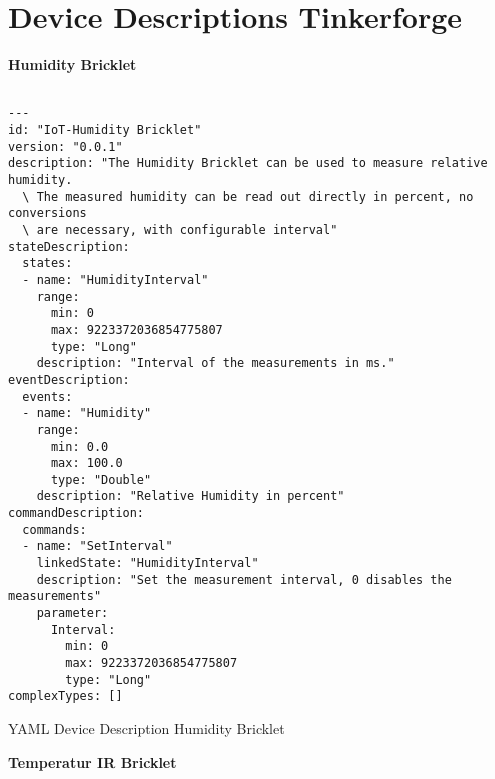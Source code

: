 \chapter{Device Descriptions Tinkerforge}
\label{app:device_descriptions}

\textbf{Humidity Bricklet}

\begin{listing}[H]
\begin{verbatim}

---
id: "IoT-Humidity Bricklet"
version: "0.0.1"
description: "The Humidity Bricklet can be used to measure relative humidity. 
  \ The measured humidity can be read out directly in percent, no conversions 
  \ are necessary, with configurable interval"
stateDescription:
  states:
  - name: "HumidityInterval"
    range:
      min: 0
      max: 9223372036854775807
      type: "Long"
    description: "Interval of the measurements in ms."
eventDescription:
  events:
  - name: "Humidity"
    range:
      min: 0.0
      max: 100.0
      type: "Double"
    description: "Relative Humidity in percent"
commandDescription:
  commands:
  - name: "SetInterval"
    linkedState: "HumidityInterval"
    description: "Set the measurement interval, 0 disables the measurements"
    parameter:
      Interval:
        min: 0
        max: 9223372036854775807
        type: "Long"
complexTypes: []

\end{verbatim}
\caption{YAML Device Description Humidity Bricklet}
\end{listing}




\textbf{Temperatur IR Bricklet}

